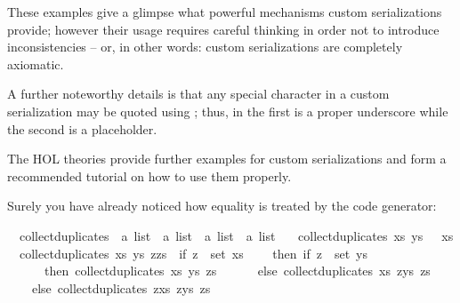 \begin{isabellebody}
\begin{isamarkuptext}
\end{isamarkuptext}%
\isamarkuptrue%
%
\begin{isamarkuptext}%
These examples give a glimpse what powerful mechanisms
  custom serializations provide; however their usage
  requires careful thinking in order not to introduce
  inconsistencies -- or, in other words:
  custom serializations are completely axiomatic.

  A further noteworthy details is that any special
  character in a custom serialization may be quoted
  using ; thus, in  the first
   is a proper underscore while the
  second \qt{\_} is a placeholder.

  The HOL theories provide further
  examples for custom serializations and form
  a recommended tutorial on how to use them properly.%
\end{isamarkuptext}%
\isamarkuptrue%
%
\isamarkuptrue%
%
\begin{isamarkuptext}%
Surely you have already noticed how equality is treated
  by the code generator:%
\end{isamarkuptext}%
\isamarkuptrue%
\isamarkupfalse%
\isanewline
\ \ collect{\isacharunderscore}duplicates\ {\isacharcolon}{\isacharcolon}\ {\isachardoublequoteopen}{\isacharprime}a\ list\ {\isasymRightarrow}\ {\isacharprime}a\ list\ {\isasymRightarrow}\ {\isacharprime}a\ list\ {\isasymRightarrow}\ {\isacharprime}a\ list{\isachardoublequoteclose}\ \isanewline
\ \ {\isachardoublequoteopen}collect{\isacharunderscore}duplicates\ xs\ ys\ {\isacharbrackleft}{\isacharbrackright}\ {\isacharequal}\ xs{\isachardoublequoteclose}\isanewline
\ \ {\isachardoublequoteopen}collect{\isacharunderscore}duplicates\ xs\ ys\ {\isacharparenleft}z{\isacharhash}zs{\isacharparenright}\ {\isacharequal}\ {\isacharparenleft}if\ z\ {\isasymin}\ set\ xs\isanewline
\ \ \ \ then\ if\ z\ {\isasymin}\ set\ ys\isanewline
\ \ \ \ \ \ then\ collect{\isacharunderscore}duplicates\ xs\ ys\ zs\isanewline
\ \ \ \ \ \ else\ collect{\isacharunderscore}duplicates\ xs\ {\isacharparenleft}z{\isacharhash}ys{\isacharparenright}\ zs\isanewline
\ \ \ \ else\ collect{\isacharunderscore}duplicates\ {\isacharparenleft}z{\isacharhash}xs{\isacharparenright}\ {\isacharparenleft}z{\isacharhash}ys{\isacharparenright}\ zs{\isacharparenright}{\isachardoublequoteclose}\isanewline
{}\isamarkupfalse%
%
\isadelimproof
\ %
\endisadelimproof
%
\isatagproof
{}\isamarkupfalse%

\end{isabellebody}
